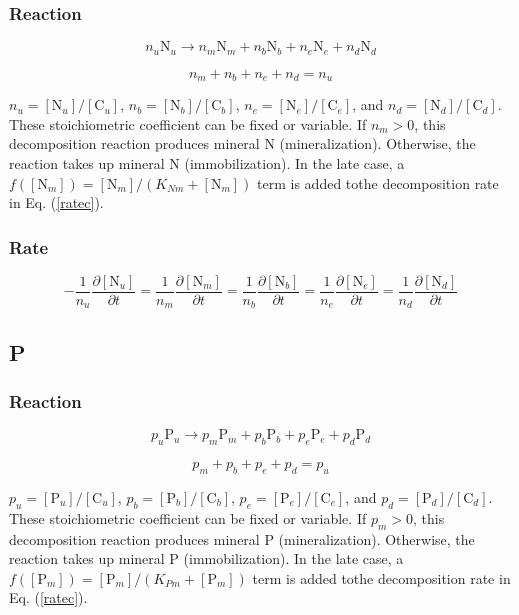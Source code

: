 \documentclass[12pt, a4paper]{article}
\begin{document}
\subsubsection{Reaction}
\begin{equation}
n_u \text{N}_u \rightarrow n_m \text{N}_m + n_b \text{N}_b + n_e \text{N}_e + n_d \text{N}_d
\end{equation}

\begin{equation}
n_m + n_b + n_e + n_d = n_u
\end{equation}

$n_u = [\text{N}_u]/[\text{C}_u]$, $n_b = [\text{N}_b]/[\text{C}_b]$, $n_e = [\text{N}_e]/[\text{C}_e]$, and $n_d = [\text{N}_d]/[\text{C}_d]$. These stoichiometric coefficient can be fixed or variable. If $n_m > 0$, this decomposition reaction produces mineral N (mineralization). Otherwise, the reaction takes up mineral N (immobilization). In the late case, a $f([\text{N}_m])=[\text{N}_m]/(K_{Nm}+[\text{N}_m])$ term is added tothe decomposition rate in Eq. (\ref{ratec}).
\subsubsection{Rate}
\begin{equation}
-\frac{1}{n_u}\frac{\partial [\text{N}_u]}{\partial t} = \frac{1}{n_m}\frac{\partial [\text{N}_m]}{\partial t} = \frac{1}{n_b} \frac{\partial [\text{N}_b]}{\partial t} = \frac{1}{n_e} \frac{\partial [\text{N}_e]}{\partial t} = \frac{1}{n_d}\frac{\partial [\text{N}_d]}{\partial t}
\end{equation}

\subsection{P}
\subsubsection{Reaction}
\begin{equation}
p_u \text{P}_u \rightarrow p_m \text{P}_m + p_b \text{P}_b + p_e \text{P}_e + p_d \text{P}_d
\end{equation}

\begin{equation}
p_m + p_b + p_e + p_d = p_u
\end{equation}

$p_u = [\text{P}_u]/[\text{C}_u]$, $p_b = [\text{P}_b]/[\text{C}_b]$, $p_e = [\text{P}_e]/[\text{C}_e]$, and $p_d = [\text{P}_d]/[\text{C}_d]$. These stoichiometric coefficient can be fixed or variable. If $p_m > 0$, this decomposition reaction produces mineral P (mineralization). Otherwise, the reaction takes up mineral P (immobilization). In the late case, a $f([\text{P}_m])=[\text{P}_m]/(K_{Pm}+[\text{P}_m])$ term is added tothe decomposition rate in Eq. (\ref{ratec}).
\end{document}
